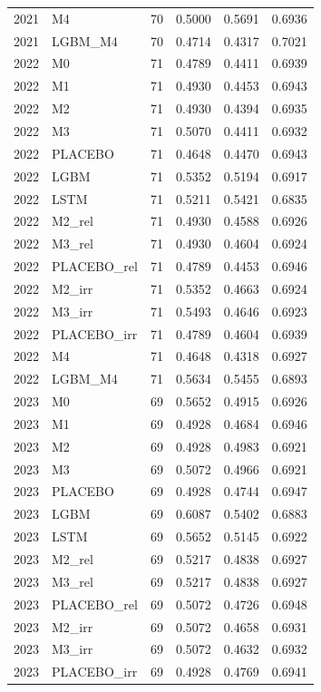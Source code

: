 \begin{tabular}{llrrrr}
2021 & M4 & 70 & 0.5000 & 0.5691 & 0.6936 \\
2021 & LGBM\_M4 & 70 & 0.4714 & 0.4317 & 0.7021 \\
2022 & M0 & 71 & 0.4789 & 0.4411 & 0.6939 \\
2022 & M1 & 71 & 0.4930 & 0.4453 & 0.6943 \\
2022 & M2 & 71 & 0.4930 & 0.4394 & 0.6935 \\
2022 & M3 & 71 & 0.5070 & 0.4411 & 0.6932 \\
2022 & PLACEBO & 71 & 0.4648 & 0.4470 & 0.6943 \\
2022 & LGBM & 71 & 0.5352 & 0.5194 & 0.6917 \\
2022 & LSTM & 71 & 0.5211 & 0.5421 & 0.6835 \\
2022 & M2\_rel & 71 & 0.4930 & 0.4588 & 0.6926 \\
2022 & M3\_rel & 71 & 0.4930 & 0.4604 & 0.6924 \\
2022 & PLACEBO\_rel & 71 & 0.4789 & 0.4453 & 0.6946 \\
2022 & M2\_irr & 71 & 0.5352 & 0.4663 & 0.6924 \\
2022 & M3\_irr & 71 & 0.5493 & 0.4646 & 0.6923 \\
2022 & PLACEBO\_irr & 71 & 0.4789 & 0.4604 & 0.6939 \\
2022 & M4 & 71 & 0.4648 & 0.4318 & 0.6927 \\
2022 & LGBM\_M4 & 71 & 0.5634 & 0.5455 & 0.6893 \\
2023 & M0 & 69 & 0.5652 & 0.4915 & 0.6926 \\
2023 & M1 & 69 & 0.4928 & 0.4684 & 0.6946 \\
2023 & M2 & 69 & 0.4928 & 0.4983 & 0.6921 \\
2023 & M3 & 69 & 0.5072 & 0.4966 & 0.6921 \\
2023 & PLACEBO & 69 & 0.4928 & 0.4744 & 0.6947 \\
2023 & LGBM & 69 & 0.6087 & 0.5402 & 0.6883 \\
2023 & LSTM & 69 & 0.5652 & 0.5145 & 0.6922 \\
2023 & M2\_rel & 69 & 0.5217 & 0.4838 & 0.6927 \\
2023 & M3\_rel & 69 & 0.5217 & 0.4838 & 0.6927 \\
2023 & PLACEBO\_rel & 69 & 0.5072 & 0.4726 & 0.6948 \\
2023 & M2\_irr & 69 & 0.5072 & 0.4658 & 0.6931 \\
2023 & M3\_irr & 69 & 0.5072 & 0.4632 & 0.6932 \\
2023 & PLACEBO\_irr & 69 & 0.4928 & 0.4769 & 0.6941 \\

\end{tabular}
